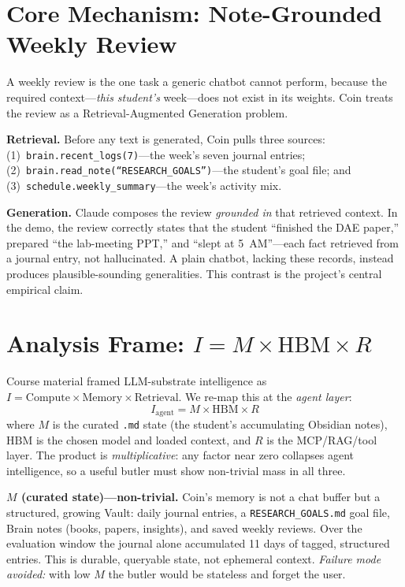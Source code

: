 \documentclass[conference]{IEEEtran}
\begin{document}
\section{Core Mechanism: Note-Grounded Weekly Review}
A weekly review is the one task a generic chatbot cannot perform, because the
required context---\emph{this student's} week---does not exist in its weights. Coin
treats the review as a Retrieval-Augmented Generation problem.

\textbf{Retrieval.} Before any text is generated, Coin pulls three sources:
(1)~\texttt{brain.recent\_logs(7)}---the week's seven journal entries;
(2)~\texttt{brain.read\_note(\textnormal{``RESEARCH\_GOALS''})}---the student's goal
file; and (3)~\texttt{schedule.weekly\_summary}---the week's activity mix.

\textbf{Generation.} Claude composes the review \emph{grounded in} that retrieved
context. In the demo, the review correctly states that the student ``finished the
DAE paper,'' prepared ``the lab-meeting PPT,'' and ``slept at 5~AM''---each fact
retrieved from a journal entry, not hallucinated. A plain chatbot, lacking these
records, instead produces plausible-sounding generalities. This contrast is the
project's central empirical claim.

\section{Analysis Frame: $I = M \times \mathrm{HBM} \times R$}
Course material framed LLM-substrate intelligence as $I = \mathrm{Compute} \times
\mathrm{Memory} \times \mathrm{Retrieval}$. We re-map this at the \emph{agent
layer}:
\begin{equation}
I_{\mathrm{agent}} = M \times \mathrm{HBM} \times R
\end{equation}
where $M$ is the curated \texttt{.md} state (the student's accumulating Obsidian
notes), $\mathrm{HBM}$ is the chosen model and loaded context, and $R$ is the
MCP/RAG/tool layer. The product is \emph{multiplicative}: any factor near zero
collapses agent intelligence, so a useful butler must show non-trivial mass in all
three.

\textbf{$M$ (curated state)---non-trivial.} Coin's memory is not a chat buffer but
a structured, growing Vault: daily journal entries, a \texttt{RESEARCH\_GOALS.md}
goal file, Brain notes (books, papers, insights), and saved weekly reviews. Over
the evaluation window the journal alone accumulated 11 days of tagged, structured
entries. This is durable, queryable state, not ephemeral context. \emph{Failure
mode avoided:} with low $M$ the butler would be stateless and forget the user.
\end{document}

